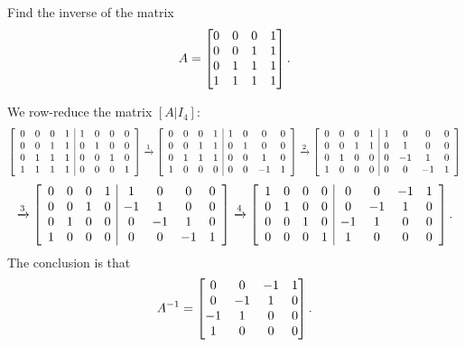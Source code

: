 \documentclass[a4paper]{amsart}
\renewenvironment{solution}{\SolutionInline}{\endSolutionInline}
\begin{document}
\begin{exercise}\label{ex-inverse-i}
 Find the inverse of the matrix 
 \[ A = \left[\begin{matrix} 0&0&0&1 \\ 0&0&1&1 \\ 0&1&1&1 \\ 1&1&1&1 \end{matrix}\right]. \]
\end{exercise}
\begin{solution}
 We row-reduce the matrix $[A|I_4]$:
 \[ 
  \left[\begin{array}{cccc|cccc}
    0 & 0 & 0 & 1 & 1 & 0 & 0 & 0 \\ 
    0 & 0 & 1 & 1 & 0 & 1 & 0 & 0 \\ 
    0 & 1 & 1 & 1 & 0 & 0 & 1 & 0 \\ 
    1 & 1 & 1 & 1 & 0 & 0 & 0 & 1
  \end{array}\right]
  \xrightarrow{1}
  \left[\begin{array}{cccc|cccc}
    0 & 0 & 0 & 1 & 1 & 0 & 0 & 0 \\ 
    0 & 0 & 1 & 1 & 0 & 1 & 0 & 0 \\ 
    0 & 1 & 1 & 1 & 0 & 0 & 1 & 0 \\ 
    1 & 0 & 0 & 0 & 0 & 0 &-1 & 1
  \end{array}\right]
  \xrightarrow{2}
  \left[\begin{array}{cccc|cccc}
    0 & 0 & 0 & 1 & 1 & 0 & 0 & 0 \\ 
    0 & 0 & 1 & 1 & 0 & 1 & 0 & 0 \\ 
    0 & 1 & 0 & 0 & 0 &-1 & 1 & 0 \\ 
    1 & 0 & 0 & 0 & 0 & 0 &-1 & 1
  \end{array}\right]
 \] \[
  \xrightarrow{3}
  \left[\begin{array}{cccc|cccc}
    0 & 0 & 0 & 1 & 1 & 0 & 0 & 0 \\ 
    0 & 0 & 1 & 0 &-1 & 1 & 0 & 0 \\ 
    0 & 1 & 0 & 0 & 0 &-1 & 1 & 0 \\ 
    1 & 0 & 0 & 0 & 0 & 0 &-1 & 1
  \end{array}\right]
  \xrightarrow{4}
  \left[\begin{array}{cccc|cccc}
    1 & 0 & 0 & 0 & 0 & 0 &-1 & 1 \\
    0 & 1 & 0 & 0 & 0 &-1 & 1 & 0 \\ 
    0 & 0 & 1 & 0 &-1 & 1 & 0 & 0 \\ 
    0 & 0 & 0 & 1 & 1 & 0 & 0 & 0 
  \end{array}\right].
 \] 
 The conclusion is that 
 \[ 
  A^{-1} = \left[\begin{matrix} 
    0 &  0 & -1 &  1 \\
    0 & -1 &  1 &  0 \\
   -1 &  1 &  0 &  0 \\
    1 &  0 &  0 &  0 
  \end{matrix}\right].
 \]
\end{solution}
\end{document}
